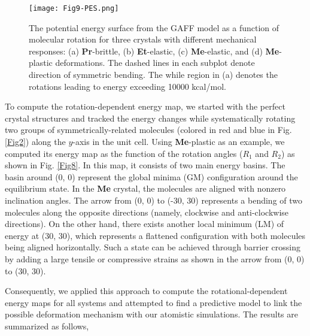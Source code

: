 \documentclass[prb,superscriptaddress,longbibliography, twocolumn]{revtex4-1}
\begin{document}
\begin{figure*}[!htbp]
\centering
\texttt{[image: Fig9-PES.png]}
\caption{\label{Fig9} The potential energy surface from the GAFF model as a function of molecular rotation for three crystals with different mechanical responses: (a) \textbf{Pr}-brittle, (b) \textbf{Et}-elastic, (c) \textbf{Me}-elastic, and (d) \textbf{Me}-plastic deformations. The dashed lines in each subplot denote direction of symmetric bending. The while region in (a) denotes the rotations leading to energy exceeding 10000 kcal/mol.}
\vspace{3mm}
\end{figure*}

To compute the rotation-dependent energy map, we started with the perfect crystal structures and tracked the energy changes while systematically rotating two groups of symmetrically-related molecules (colored in red and blue in Fig. \ref{Fig2}) along the $y$-axis in the unit cell. Using \textbf{Me}-plastic as an example, we computed its energy map as the function of the rotation angles ($R_1$ and $R_2$) as shown in Fig. \ref{Fig8}. In this map, it consists of two main energy basins. The basin around (0, 0) represent the global minima (GM) configuration around the equilibrium state. In the \textbf{Me} crystal, the molecules are aligned with nonzero inclination angles. The arrow from (0, 0) to (-30, 30) represents a bending of two molecules along the opposite directions (namely, clockwise and anti-clockwise directions). On the other hand, there exists another local minimum (LM) of energy at (30, 30), which represents a flattened configuration with both molecules being aligned horizontally. Such a state can be achieved through barrier crossing by adding a large tensile or compressive strains as shown in the arrow from (0, 0) to (30, 30). 


Consequently, we applied this approach to compute the rotational-dependent energy maps for all systems and attempted to find a predictive model to link the possible deformation mechanism with our atomistic simulations. The results are summarized as follows, 
\end{document}
